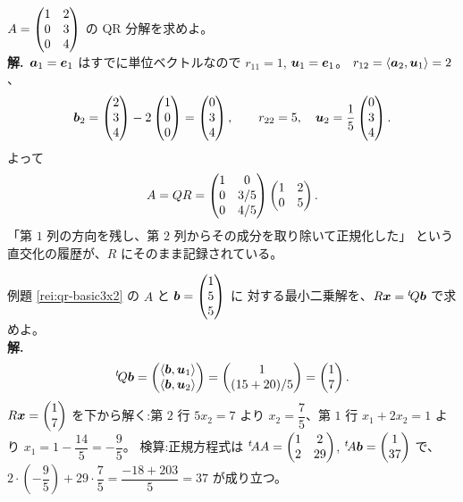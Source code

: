 \begin{rei}\label{rei:qr-basic3x2}
$A = \begin{pmatrix}1 & 2 \\ 0 & 3 \\ 0 & 4\end{pmatrix}$ の QR 分解を求めよ。\\
\textbf{解.}\ $\bm{a}_1 = \bm{e}_1$ はすでに単位ベクトルなので
$r_{11} = 1$, $\bm{u}_1 = \bm{e}_1$。
$r_{12} = \langle \bm{a}_2, \bm{u}_1 \rangle = 2$、
\[
\bm{b}_2 = \begin{pmatrix}2 \\ 3 \\ 4\end{pmatrix} - 2\begin{pmatrix}1 \\ 0 \\ 0\end{pmatrix} = \begin{pmatrix}0 \\ 3 \\ 4\end{pmatrix},
\qquad r_{22} = 5, \quad \bm{u}_2 = \frac{1}{5}\begin{pmatrix}0 \\ 3 \\ 4\end{pmatrix}.
\]
よって
\[
A = QR = \begin{pmatrix}1 & 0 \\ 0 & 3/5 \\ 0 & 4/5\end{pmatrix}\begin{pmatrix}1 & 2 \\ 0 & 5\end{pmatrix}.
\]
「第 $1$ 列の方向を残し、第 $2$ 列からその成分を取り除いて正規化した」
という直交化の履歴が、$R$ にそのまま記録されている。
\end{rei}

\begin{rei}[例題・基本(QR で最小二乗)]\label{rei:qr-lsq-ex}
例題 \ref{rei:qr-basic3x2} の $A$ と $\bm{b} = \begin{pmatrix}1 \\ 5 \\ 5\end{pmatrix}$ に
対する最小二乗解を、$R\bm{x} = {}^t\!Q\bm{b}$ で求めよ。\\
\textbf{解.}\
\[
{}^t\!Q\bm{b} = \begin{pmatrix}\langle \bm{b}, \bm{u}_1 \rangle \\
\langle \bm{b}, \bm{u}_2 \rangle\end{pmatrix}
= \begin{pmatrix}1 \\ (15 + 20)/5\end{pmatrix} = \begin{pmatrix}1 \\ 7\end{pmatrix}.
\]
$R\bm{x} = \begin{pmatrix}1 \\ 7\end{pmatrix}$ を下から解く:第 $2$ 行 $5x_2 = 7$ より
$x_2 = \dfrac{7}{5}$、第 $1$ 行 $x_1 + 2x_2 = 1$ より
$x_1 = 1 - \dfrac{14}{5} = -\dfrac{9}{5}$。
検算:正規方程式は ${}^t\!AA = \begin{pmatrix}1 & 2 \\ 2 & 29\end{pmatrix}$,
${}^t\!A\bm{b} = \begin{pmatrix}1 \\ 37\end{pmatrix}$ で、
$2 \cdot \left(-\dfrac{9}{5}\right) + 29 \cdot \dfrac{7}{5}
= \dfrac{-18 + 203}{5} = 37$ が成り立つ。
\end{rei}

